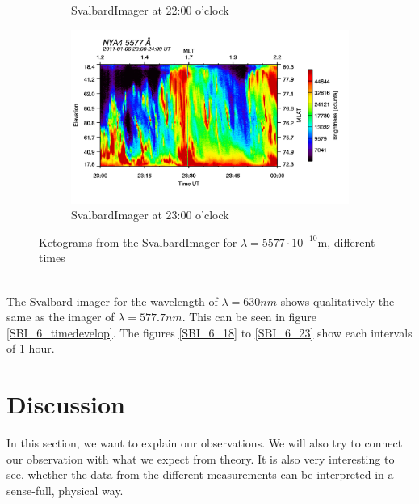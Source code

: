 \documentclass[10pt,a4paper]{article}
\begin{document}
\begin{figure}[h]
\begin{subfigure}{0.3\textwidth}
	\caption{ SvalbardImager at 22:00 o'clock \label{SBI_5_22}}
\end{subfigure}
\begin{subfigure}{0.3\textwidth}
\centering
	\includegraphics[width=\textwidth]{SvalbardImager5577A23.png}
	\caption{ SvalbardImager at 23:00 o'clock \label{SBI_5_23}}
\end{subfigure}
\caption{Ketograms from the SvalbardImager for $\lambda=5577 \cdot 10^{-10} \mathrm{m}$, different times }
\label{SBI_5_timedevelop}
\end{figure}
\\
The Svalbard imager for the wavelength of $\lambda=630 nm$ shows qualitatively the same as the imager of $\lambda=577.7 nm$.  This can be seen in figure \ref{SBI_6_timedevelop}. The figures \ref{SBI_6_18} to \ref{SBI_6_23} show each intervals of 1 hour. 
\clearpage


\section{Discussion \label{discussion}}

In this section, we want to explain our observations. We will also try to connect our observation with what we expect from theory. 
It is also very interesting to see, whether the data from the different measurements can be interpreted in a sense-full, physical way.
\end{document}

